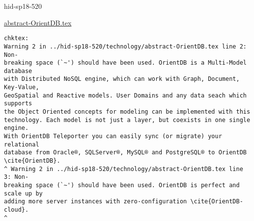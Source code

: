 \begin{IU}

hid-sp18-520

\href{https://github.com/cloudmesh-community/hid-sp18-520/blob/master//technology/abstract-OrientDB.tex}{abstract-OrientDB.tex}

\begin{tiny}
\begin{verbatim}
chktex:
Warning 2 in ../hid-sp18-520/technology/abstract-OrientDB.tex line 2: Non-
breaking space (`~') should have been used. OrientDB is a Multi-Model database
with Distributed NoSQL engine, which can work with Graph, Document, Key-Value,
GeoSpatial and Reactive models. User Domains and any data seach which supports
the Object Oriented concepts for modeling can be implemented with this
technology. Each model is not just a layer, but coexists in one single engine.
With OrientDB Teleporter you can easily sync (or migrate) your relational
database from Oracle®, SQLServer®, MySQL® and PostgreSQL® to OrientDB
\cite{OrientDB}.
^ Warning 2 in ../hid-sp18-520/technology/abstract-OrientDB.tex line 3: Non-
breaking space (`~') should have been used. OrientDB is perfect and scale up by
adding more server instances with zero-configuration \cite{OrientDB-cloud}.
^
\end{verbatim}
\end{tiny}
\end{IU}



